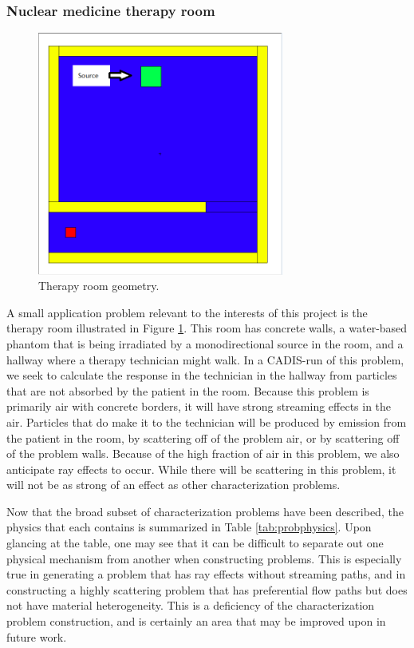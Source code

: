 \subsubsection*{Nuclear medicine therapy room}

\begin{figure}[h!]
  \centering
  \includegraphics[height=8cm]{./chapters/characterization_probs/figures/geometries/therapy-room.png}
  \caption[Nuclear medicine therapy room.]{Therapy room geometry.}
  \label{fig:therapygeom}
\end{figure}

A small application problem relevant to the interests of this project is the
therapy room illustrated in Figure \ref{fig:therapygeom}. This room has concrete
walls, a water-based phantom that is being irradiated by a monodirectional
source in the room, and a hallway where a therapy technician might walk. In a
CADIS-run of this problem, we seek to calculate the response in the
technician in the hallway from particles that are not absorbed by the patient in
the room. Because this problem is primarily air with concrete
borders, it will have strong streaming effects in the air. Particles that do
make it to the technician will be produced by emission from the patient in the
room, by scattering off of the problem air, or by scattering off of the problem
walls. Because of the high fraction of air in this problem, we also anticipate
ray effects to occur. While there will be scattering in this problem, it will
not be as strong of an effect as other characterization problems.

Now that the broad subset of characterization problems have been described,
the physics that each contains is summarized in Table \ref{tab:probphysics}.
Upon glancing at the table, one may see that it can be difficult to separate
out one physical mechanism from another when constructing problems. This is
especially true in generating a problem that has ray effects without streaming
paths, and in constructing a highly scattering problem that has preferential
flow paths but does not have material heterogeneity. This is a
deficiency of the characterization problem construction, and is certainly an
area that may be improved upon in future work.

